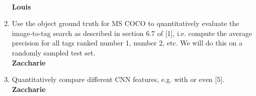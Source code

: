 \documentclass[a4paper,12pt]{article}
\begin{document}
\begin{enumerate}
  \\\textbf{Louis}
  \item Use the object ground truth for MS COCO to quantitatively evaluate the image-to-tag search as described in section 6.7 of [1], i.e. compute the average precision for all tags ranked number 1, number 2, etc. We will do this on a randomly sampled test set.
  \\\textbf{Zaccharie}
  \item Quantitatively compare different CNN features, e.g. \cite{overfeat} with \cite{vgg} or even [5].
  \\\textbf{Zaccharie}
\end{enumerate}



\begin{thebibliography}{9}


\end{thebibliography}
\end{document}

